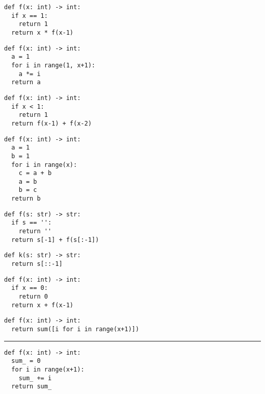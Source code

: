 \documentclass[12pt,a4paper]{article}
\begin{document}
\pagestyle{empty}
\noindent

\begin{multicols}{2}

\begin{lstlisting}
def f(x: int) -> int:
  if x == 1:
    return 1
  return x * f(x-1)
\end{lstlisting}

\begin{lstlisting}
def f(x: int) -> int:
  a = 1
  for i in range(1, x+1):
    a *= i
  return a
\end{lstlisting}

\begin{lstlisting}
def f(x: int) -> int:
  if x < 1:
    return 1
  return f(x-1) + f(x-2)
\end{lstlisting}

\begin{lstlisting}
def f(x: int) -> int:
  a = 1
  b = 1
  for i in range(x):
    c = a + b
    a = b
    b = c
  return b
\end{lstlisting}

\begin{lstlisting}
def f(s: str) -> str:
  if s == '':
    return ''
  return s[-1] + f(s[:-1])
\end{lstlisting}

\begin{lstlisting}
def k(s: str) -> str:
  return s[::-1]
\end{lstlisting}

\begin{lstlisting}
def f(x: int) -> int:
  if x == 0:
    return 0
  return x + f(x-1)
\end{lstlisting}

\begin{lstlisting}
def f(x: int) -> int:
  return sum([i for i in range(x+1)])
\end{lstlisting}

\rule{\linewidth}{1pt}

\begin{lstlisting}
def f(x: int) -> int:
  sum_ = 0
  for i in range(x+1):
    sum_ += i
  return sum_
\end{lstlisting}

\end{multicols}
\end{document}
